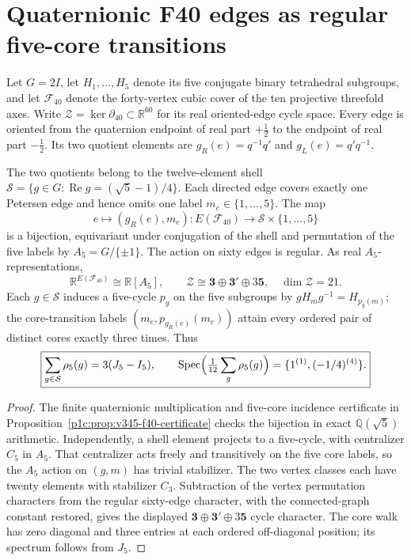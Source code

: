 \documentclass[11pt]{article}
\begin{document}
\clearpage
\section{Quaternionic F40 edges as regular five-core transitions}
\label{p1:sec:v345-f40-native-arrows}
Let $G=2I$, let $H_1,\ldots,H_5$ denote its five conjugate
binary tetrahedral subgroups, and let $\mathcal F_{40}$ denote the
forty-vertex cubic cover of the ten projective threefold axes.
Write $\mathcal Z=\ker\partial_{40}\subset\mathbb R^{60}$ for its
real oriented-edge cycle space.  Every edge is oriented from the
quaternion endpoint of real part $+\tfrac12$ to the endpoint of
real part $-\tfrac12$.  Its two quotient elements are
$g_R(e)=q^{-1}q'$ and $g_L(e)=q'q^{-1}$.

\begin{theorem}
\label{p1:thm:v345-f40-edge-regular}
The two quotients belong to the twelve-element shell
$\mathcal S=\{g\in G:\operatorname{Re}g=(\sqrt5-1)/4\}$.
Each directed edge covers exactly one Petersen edge and hence omits
one label $m_e\in\{1,\ldots,5\}$.  The map
\[
 e\longmapsto(g_R(e),m_e):E(\mathcal F_{40})\longrightarrow
 \mathcal S\times\{1,\ldots,5\}
\]
is a bijection, equivariant under conjugation of the shell and
permutation of the five labels by $A_5=G/\{\pm1\}$.  The action on
sixty edges is regular.  As real $A_5$-representations,
\[
 \mathbb R^{E(\mathcal F_{40})}\cong\mathbb R[A_5],\qquad
 \boxed{\mathcal Z\cong\mathbf3\oplus\mathbf3'\oplus3\mathbf5,
 \quad\dim\mathcal Z=21.}
\]
Each $g\in\mathcal S$ induces a five-cycle $p_g$ on the five
subgroups by $gH_mg^{-1}=H_{p_g(m)}$; the core-transition labels
$(m_e,p_{g_R(e)}(m_e))$ attain every ordered pair of distinct cores
exactly three times.  Thus
\[
 \boxed{\sum_{g\in\mathcal S}\rho_5(g)=3(J_5-I_5),\qquad
 \operatorname{Spec}\Bigl(\tfrac1{12}\sum_g\rho_5(g)\Bigr)
 =\{1^{(1)},(-1/4)^{(4)}\}.}
\]
\end{theorem}
\begin{proof}
The finite quaternionic multiplication and five-core incidence
certificate in Proposition~\ref{p1c:prop:v345-f40-certificate}
checks the bijection in exact $\mathbb Q(\sqrt5)$ arithmetic.
Independently, a shell element projects to a five-cycle, with
centralizer $C_5$ in $A_5$.  That centralizer acts freely and
transitively on the five core labels, so the $A_5$ action on
$(g,m)$ has trivial stabilizer.  The two vertex classes each have
twenty elements with stabilizer $C_3$.  Subtraction of the vertex
permutation characters from the regular sixty-edge character, with
the connected-graph constant restored, gives the displayed
$\mathbf3\oplus\mathbf3'\oplus3\mathbf5$ cycle character.
The core walk has zero diagonal and three entries at each ordered
off-diagonal position; its spectrum follows from $J_5$.
\end{proof}
\end{document}
